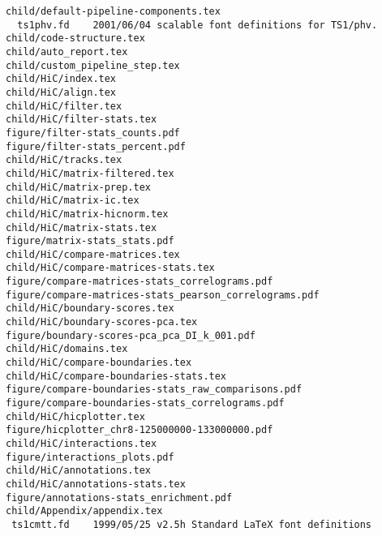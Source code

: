 \begin{lstlisting}
child/default-pipeline-components.tex
  ts1phv.fd    2001/06/04 scalable font definitions for TS1/phv.
child/code-structure.tex
child/auto_report.tex
child/custom_pipeline_step.tex
child/HiC/index.tex
child/HiC/align.tex
child/HiC/filter.tex
child/HiC/filter-stats.tex
figure/filter-stats_counts.pdf
figure/filter-stats_percent.pdf
child/HiC/tracks.tex
child/HiC/matrix-filtered.tex
child/HiC/matrix-prep.tex
child/HiC/matrix-ic.tex
child/HiC/matrix-hicnorm.tex
child/HiC/matrix-stats.tex
figure/matrix-stats_stats.pdf
child/HiC/compare-matrices.tex
child/HiC/compare-matrices-stats.tex
figure/compare-matrices-stats_correlograms.pdf
figure/compare-matrices-stats_pearson_correlograms.pdf
child/HiC/boundary-scores.tex
child/HiC/boundary-scores-pca.tex
figure/boundary-scores-pca_pca_DI_k_001.pdf
child/HiC/domains.tex
child/HiC/compare-boundaries.tex
child/HiC/compare-boundaries-stats.tex
figure/compare-boundaries-stats_raw_comparisons.pdf
figure/compare-boundaries-stats_correlograms.pdf
child/HiC/hicplotter.tex
figure/hicplotter_chr8-125000000-133000000.pdf
child/HiC/interactions.tex
figure/interactions_plots.pdf
child/HiC/annotations.tex
child/HiC/annotations-stats.tex
figure/annotations-stats_enrichment.pdf
child/Appendix/appendix.tex
 ts1cmtt.fd    1999/05/25 v2.5h Standard LaTeX font definitions
 \end{lstlisting} 

